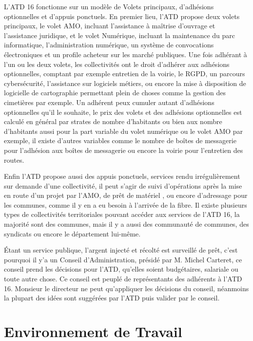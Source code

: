 \documentclass[a4paper,12pt]{report}
\begin{document}
L'ATD 16 fonctionne sur un modèle de Volets principaux, d'adhésions optionnelles et d'appuis ponctuels. En premier lieu, l'ATD propose deux volets principaux, le volet AMO, incluant l'assistance à maîtrise d'ouvrage et l'assistance juridique, et le volet Numérique, incluant la maintenance du parc informatique, l'administration numérique, un système de convocations électroniques et un profile acheteur sur les marché publiques. Une fois adhérant à l'un ou les deux volets, les collectivités ont le droit d'adhérer aux adhésions optionnelles, comptant par exemple entretien de la voirie, le RGPD, un parcours cybersécurité, l'assistance sur logiciels métiers, ou encore la mise à disposition de logicielle de cartographie permettant plein de choses comme la gestion des cimetières par exemple. Un adhérent peux cumuler autant d'adhésions optionnelles qu'il le souhaite, le prix des volets et des adhésions optionnelles est calculé en général par strates de nombre d'habitants ou bien aux nombre d'habitants aussi pour la part variable du volet numérique ou le volet AMO par exemple, il existe d'autres variables comme le nombre de boîtes de messagerie pour l'adhésion aux boîtes de messagerie ou encore la voirie pour l'entretien des routes.

Enfin l'ATD propose aussi des appuis ponctuels, services rendu irrégulièrement sur demande d'une collectivité, il peut s'agir de suivi d'opérations après la mise en route d'un projet par l'AMO, de prêt de matériel , ou encore d'adressage pour les communes, comme il y en a eu besoin à l'arrivée de la fibre. Il existe plusieurs types de collectivités territoriales pouvant accéder aux services de l'ATD 16, la majorité sont des communes, mais il y a aussi des communauté de communes, des syndicats ou encore le département lui-même.

Étant un service publique, l'argent injecté et récolté est surveillé de prêt, c'est pourquoi il y'a un Conseil d'Administration, présidé par M. Michel Carteret, ce conseil prend les décisions pour l'ATD, qu'elles soient budgétaires, salariale ou toute autre chose. Ce conseil est peuplé de représentants des adhérents à l'ATD 16. Monsieur le directeur ne peut qu'appliquer les décisions du conseil, néanmoins la plupart des idées sont suggérées par l'ATD puis valider par le conseil.

\section{Environnement de Travail}
\end{document}
